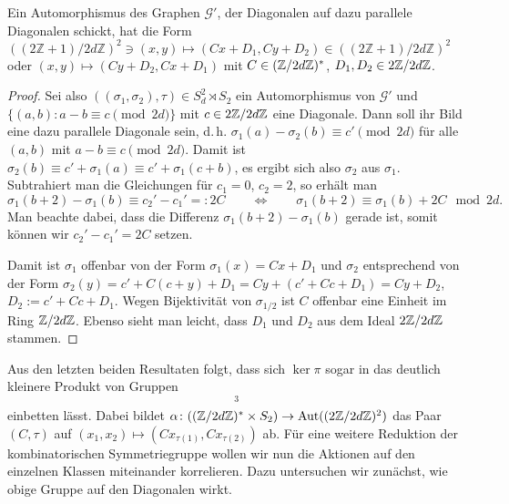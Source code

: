 \begin{lemma}
Ein Automorphismus des Graphen $\mathcal G'$, der Diagonalen auf dazu parallele Diagonalen schickt, hat die Form $((2\mathbb Z+1)/2d\mathbb Z)^2 \ni (x,y) \mapsto (Cx+D_1, Cy+D_2) \in ((2\mathbb Z+1)/2d\mathbb Z)^2$ oder $(x,y) \mapsto (Cy+D_2, Cx+D_1)$ mit $C \in (\Zmod 2dZ)^*$, $D_1, D_2 \in 2\Zmod 2dZ$.
\end{lemma}
\begin{proof}
Sei also $((\sigma_1, \sigma_2), \tau) \in S_d^2 \rtimes S_2$ ein Automorphismus von $\mathcal G'$ und $\{(a,b) : a-b \equiv c \pmod{2d}\}$ mit $c \in 2\Zmod 2dZ$ eine Diagonale. Dann soll ihr Bild eine dazu parallele Diagonale sein, d.\,h. $\sigma_1(a) - \sigma_2(b) \equiv c' \pmod{2d}$ für alle $(a,b)$ mit $a-b \equiv c \pmod{2d}$. Damit ist $\sigma_2(b) \equiv c' + \sigma_1(a) \equiv c' + \sigma_1(c+b)$, es ergibt sich also $\sigma_2$ aus $\sigma_1$. Subtrahiert man die Gleichungen für $c_1=0$, $c_2=2$, so erhält man
\begin{equation*}
\sigma_1(b+2) - \sigma_1(b) \equiv c_2' - c_1' =: 2C \qquad\Longleftrightarrow\qquad \sigma_1(b+2) \equiv \sigma_1(b) + 2C  \mod{2d}.
\end{equation*}
Man beachte dabei, dass die Differenz $\sigma_1(b+2) - \sigma_1(b)$ gerade ist, somit können wir $c_2' - c_1' = 2C$ setzen.

Damit ist $\sigma_1$ offenbar von der Form $\sigma_1(x) = Cx+D_1$ und $\sigma_2$ entsprechend von der Form $\sigma_2(y) = c' + C(c+y) + D_1 = Cy + (c'+Cc+D_1) = Cy + D_2$, $D_2 := c'+Cc+D_1$. Wegen Bijektivität von $\sigma_{1/2}$ ist $C$ offenbar eine Einheit im Ring $\Zmod 2dZ$. Ebenso sieht man leicht, dass $D_1$ und $D_2$ aus dem Ideal $2\Zmod 2dZ$ stammen.
\end{proof}

Aus den letzten beiden Resultaten folgt, dass sich $\ker \pi$ sogar in das deutlich kleinere Produkt von Gruppen
\begin{equation*}
[(2\Zmod 2dZ)^2 \rtimes_\alpha ((\Zmod 2dZ)^* \times S_2)]^3
\end{equation*}
einbetten lässt. Dabei bildet $\alpha \colon ((\Zmod 2dZ)^* \times S_2) \to \Aut ((2\Zmod 2dZ)^2)$ das Paar $(C,\tau)$ auf $(x_1,x_2) \mapsto (Cx_{\tau(1)},Cx_{\tau(2)})$ ab. Für eine weitere Reduktion der kombinatorischen Symmetriegruppe wollen wir nun die Aktionen auf den einzelnen Klassen miteinander korrelieren. Dazu untersuchen wir zunächst, wie obige Gruppe auf den Diagonalen wirkt.

